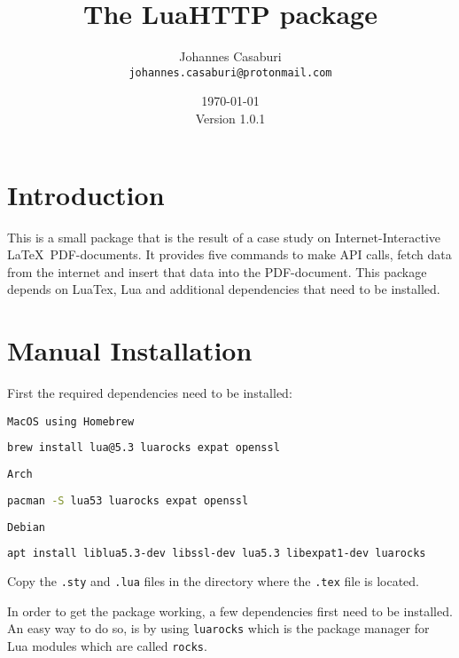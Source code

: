 \documentclass[11pt]{article}
\begin{document}
\setlength{\parindent}{0pt}
\setlength{\parskip}{5pt plus 2pt minus 1pt}

\title{The \textsf{LuaHTTP} package}
\author{Johannes Casaburi \\ \texttt{johannes.casaburi@protonmail.com}}
\date{\today\\Version 1.0.1}

\maketitle

\tableofcontents

\newpage

\section{Introduction}
This is a small package that is the result of a case study on Internet-Interactive \LaTeX\ PDF-documents. It provides five commands to make API calls, fetch data from the internet and insert that data into the PDF-document. This package depends on LuaTex, Lua and additional dependencies that need to be installed.

\section{Manual Installation}
First the required dependencies need to be installed:

\texttt{MacOS using Homebrew}
\begin{lstlisting}[language=bash]
brew install lua@5.3 luarocks expat openssl
\end{lstlisting}

\texttt{Arch}
\begin{lstlisting}[language=bash]
pacman -S lua53 luarocks expat openssl
\end{lstlisting}

\texttt{Debian}
\begin{lstlisting}[language=bash]
apt install liblua5.3-dev libssl-dev lua5.3 libexpat1-dev luarocks
\end{lstlisting}

Copy the \texttt{.sty} and \texttt{.lua} files in the directory where the \texttt{.tex} file is located.

In order to get the package working, a few dependencies first need to be installed. An easy way to do so, is by using \texttt{luarocks} which is the package manager for Lua modules which are called \texttt{rocks}.
\end{document}
